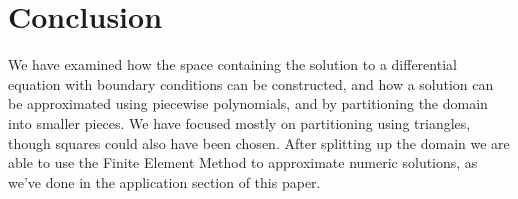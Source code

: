 \chapter{Conclusion}
We have examined how the space containing the solution to a differential equation 
with boundary conditions can be constructed, and how a solution can be 
approximated using piecewise polynomials, and by partitioning the domain 
into smaller pieces.
We have focused mostly on partitioning using triangles, though squares could 
also have been chosen.
After splitting up the domain we are able to use the Finite Element Method to approximate numeric solutions, 
as we've done in the application section of this paper.